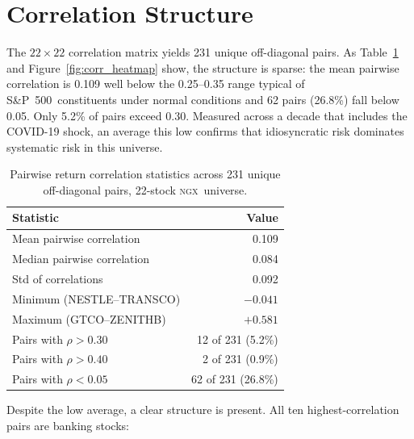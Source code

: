 \documentclass[twoside,11pt]{article}
\newcommand{\ngx}{\textsc{ngx}}
\newcommand{\spidx}{S\&P~500}
\begin{document}
	
	\section{Correlation Structure}
	\label{sec:corr}
	
	The $22 \times 22$ correlation matrix yields 231 unique off-diagonal pairs. As Table~\ref{tab:corr_summary} and Figure~\ref{fig:corr_heatmap} show, the structure is sparse: the mean pairwise correlation is 0.109 well below the 0.25--0.35 range typical of \spidx\ constituents
	under normal conditions and 62 pairs (26.8\%) fall below 0.05. Only 5.2\% of pairs exceed 0.30. Measured across a decade that includes the COVID-19 shock, an average this low confirms that idiosyncratic risk dominates systematic risk in this universe.
	\newpage
	\begin{table}[ht]
		\centering
		\caption{Pairwise return correlation statistics across 231
			unique off-diagonal pairs, 22-stock \ngx\ universe.}
		\label{tab:corr_summary}
		\begin{tabular}{lr}
			\toprule
			\textbf{Statistic} & \textbf{Value}\\
			\midrule
			Mean pairwise correlation    & 0.109\\
			Median pairwise correlation  & 0.084\\
			Std of correlations          & 0.092\\
			Minimum (NESTLE--TRANSCO)    & $-0.041$\\
			Maximum (GTCO--ZENITHB)      & $+0.581$\\
			Pairs with $\rho > 0.30$     & 12 of 231 (5.2\%)\\
			Pairs with $\rho > 0.40$     & 2 of 231 (0.9\%)\\
			Pairs with $\rho < 0.05$     & 62 of 231 (26.8\%)\\
			\bottomrule
		\end{tabular}
	\end{table}
	
	Despite the low average, a clear structure is present. All ten	highest-correlation pairs are banking stocks:
	
\end{document}
